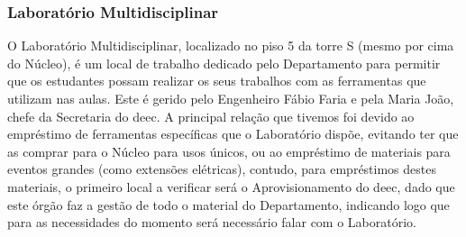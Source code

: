 
\subsubsection{Laboratório Multidisciplinar}

O Laboratório Multidisciplinar, localizado no piso 5 da torre S (mesmo por cima do Núcleo), é um local de trabalho dedicado pelo Departamento para permitir que os estudantes possam realizar os seus trabalhos com as ferramentas que utilizam nas aulas. Este é gerido pelo Engenheiro Fábio Faria e pela Maria João, chefe da Secretaria do \acrshort{deec}. A principal relação que tivemos foi devido ao empréstimo de ferramentas específicas que o Laboratório dispõe, evitando ter que as comprar para o Núcleo para usos únicos, ou ao empréstimo de materiais para eventos grandes (como extensões elétricas), contudo, para empréstimos destes materiais, o primeiro local a verificar será o Aprovisionamento do \acrshort{deec}, dado que este órgão faz a gestão de todo o material do Departamento, indicando logo que para as necessidades do momento será necessário falar com o Laboratório.